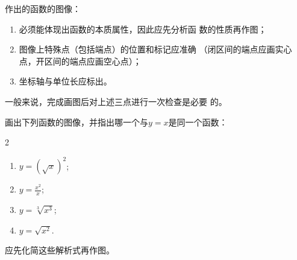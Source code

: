    

\begin{note}
    作出的函数的图像：
\begin{enumerate}[(1)]
\item 必须能体现出函数的本质属性，因此应先分析函
数的性质再作图；
\item 图像上特殊点（包括端点）的位置和标记应准确
（闭区间的端点应画实心点，开区间的端点应画空心点）；
\item 坐标轴与单位长应标出。
\end{enumerate}
\end{note}

一般来说，完成画图后对上述三点进行一次检查是必要
的。


\begin{example}
    画出下列函数的图像，并指出哪一个与$y=x$是同一个函数：
\begin{multicols}{2}
\begin{enumerate}[(1)]
    \item $y=\left(\sqrt{x}\right)^2$;
    \item $y=\frac{x^2}{x}$;
    \item $y=\sqrt[3]{x^3}$;
    \item $y=\sqrt{x^2}$.
\end{enumerate}
\end{multicols}
\end{example}

\begin{analyze}
    应先化简这些解析式再作图。
\end{analyze}

